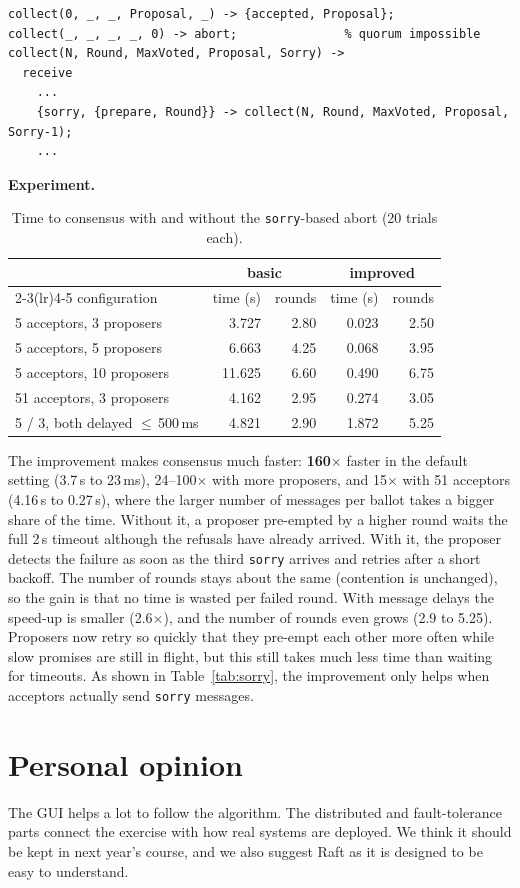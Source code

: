 \documentclass[a4paper, 10pt]{article}
\begin{document}
\begin{lstlisting}
collect(0, _, _, Proposal, _) -> {accepted, Proposal};
collect(_, _, _, _, 0) -> abort;               % quorum impossible
collect(N, Round, MaxVoted, Proposal, Sorry) ->
  receive
    ...
    {sorry, {prepare, Round}} -> collect(N, Round, MaxVoted, Proposal, Sorry-1);
    ...
\end{lstlisting}

\textbf{Experiment.}

\begin{table}[H]
\centering
\begin{tabular}{lrrrr}
\toprule
& \multicolumn{2}{c}{basic} & \multicolumn{2}{c}{improved} \\
\cmidrule(lr){2-3}\cmidrule(lr){4-5}
configuration & time (s) & rounds & time (s) & rounds \\
\midrule
5 acceptors, 3 proposers  & 3.727  & 2.80 & 0.023 & 2.50 \\
5 acceptors, 5 proposers  & 6.663  & 4.25 & 0.068 & 3.95 \\
5 acceptors, 10 proposers & 11.625 & 6.60 & 0.490 & 6.75 \\
51 acceptors, 3 proposers & 4.162  & 2.95 & 0.274 & 3.05 \\
5 / 3, both delayed $\le$\,500\,ms & 4.821 & 2.90 & 1.872 & 5.25 \\
\bottomrule
\end{tabular}
\caption{Time to consensus with and without the \texttt{sorry}-based abort (20 trials each).}
\label{tab:improvement}
\end{table}

The improvement makes consensus much faster: \textbf{160$\times$} faster in the default setting (3.7\,s to 23\,ms), 24--100$\times$ with more proposers, and 15$\times$ with 51 acceptors (4.16\,s to 0.27\,s), where the larger number of messages per ballot takes a bigger share of the time. Without it, a proposer pre-empted by a higher round waits the full 2\,s timeout although the refusals have already arrived. With it, the proposer detects the failure as soon as the third \texttt{sorry} arrives and retries after a short backoff. The number of rounds stays about the same (contention is unchanged), so the gain is that no time is wasted per failed round. With message delays the speed-up is smaller (2.6$\times$), and the number of rounds even grows (2.9 to 5.25). Proposers now retry so quickly that they pre-empt each other more often while slow promises are still in flight, but this still takes much less time than waiting for timeouts. As shown in Table~\ref{tab:sorry}, the improvement only helps when acceptors actually send \texttt{sorry} messages.

\section{Personal opinion}

The GUI helps a lot to follow the algorithm. The distributed and fault-tolerance parts connect the exercise with how real systems are deployed. We think it should be kept in next year's course, and we also suggest Raft as it is designed to be easy to understand.
\end{document}
